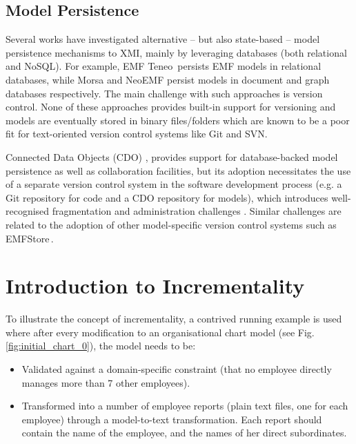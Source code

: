 \documentclass[12pt, a4paper]{report} \usepackage[titletoc]{appendix}
\begin{document}
\subsection{Model Persistence}
\label{subsec:model_persistence}
Several works have investigated alternative -- but also state-based -- model persistence mechanisms to XMI, mainly by leveraging databases (both relational and NoSQL). For example, EMF Teneo\,\cite{eclipse2017teneo} persists EMF models in relational databases, while Morsa \cite{pagan2011morsa} and NeoEMF \cite{daniel2016neoemf} persist models in document and graph databases respectively. The main challenge with such approaches is version control. None of these approaches provides built-in support for versioning and models are eventually stored in binary files/folders which are known to be a poor fit for text-oriented version control systems like Git and SVN.

Connected Data Objects (CDO) \cite{eclipse2017cdo}, provides support for database-backed model persistence as well as collaboration facilities, but its adoption necessitates the use of a separate version control system in the software development process (e.g. a Git repository for code and a CDO repository for models), which introduces well-recognised fragmentation and administration challenges \cite{barmpis2014evaluation}. Similar challenges are related to the adoption of other model-specific version control systems such as EMFStore\,\cite{koegel2010emfstore}.

\section{Introduction to Incrementality}
\label{introduction_to_incrementality}
To illustrate the concept of incrementality, a contrived running example is used where after every modification to an organisational chart model (see Fig. \ref{fig:initial_chart_0}), the model needs to be:

\begin{itemize}
	\item Validated against a domain-specific constraint (that no employee directly manages more than 7 other employees).
	\item Transformed into a number of employee reports (plain text files, one for each employee) through a model-to-text transformation. Each report should contain the name of the employee, and the names of her direct subordinates.
\end{itemize}
\end{document}
